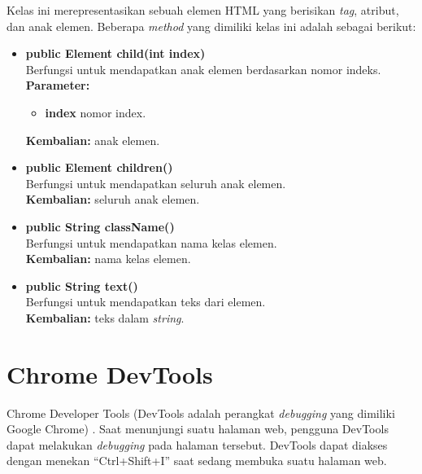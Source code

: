 Kelas ini merepresentasikan sebuah elemen HTML yang berisikan \textit{tag}, atribut, dan anak elemen. Beberapa \textit{method} yang dimiliki kelas ini adalah sebagai berikut:
\begin{itemize}
	\item \textbf{public Element child(int index)} \\
		Berfungsi untuk mendapatkan anak elemen berdasarkan nomor indeks. \\
		\textbf{Parameter:} 
		\begin{itemize}
			\item \textbf{index} nomor index.
		\end{itemize}
		\textbf{Kembalian:} anak elemen.	
		
		\item \textbf{public Element children()} \\
		Berfungsi untuk mendapatkan seluruh anak elemen. \\
		\textbf{Kembalian:} seluruh anak elemen.	
		
		\item \textbf{public String className()} \\
		Berfungsi untuk mendapatkan nama kelas elemen. \\
		\textbf{Kembalian:} nama kelas elemen.	
		
		\item \textbf{public String text()} \\
		Berfungsi untuk mendapatkan teks dari elemen. \\
		\textbf{Kembalian:} teks dalam \textit{string}.	
\end{itemize}



\section{Chrome DevTools}
\label{sec:devtools}

Chrome Developer Tools (DevTools adalah perangkat \textit{debugging} yang dimiliki Google Chrome) \cite{devtools}. Saat menunjungi suatu halaman web, pengguna DevTools dapat melakukan \textit{debugging} pada halaman tersebut. DevTools dapat diakses dengan menekan ``Ctrl+Shift+I'' saat sedang membuka suatu halaman web.  

